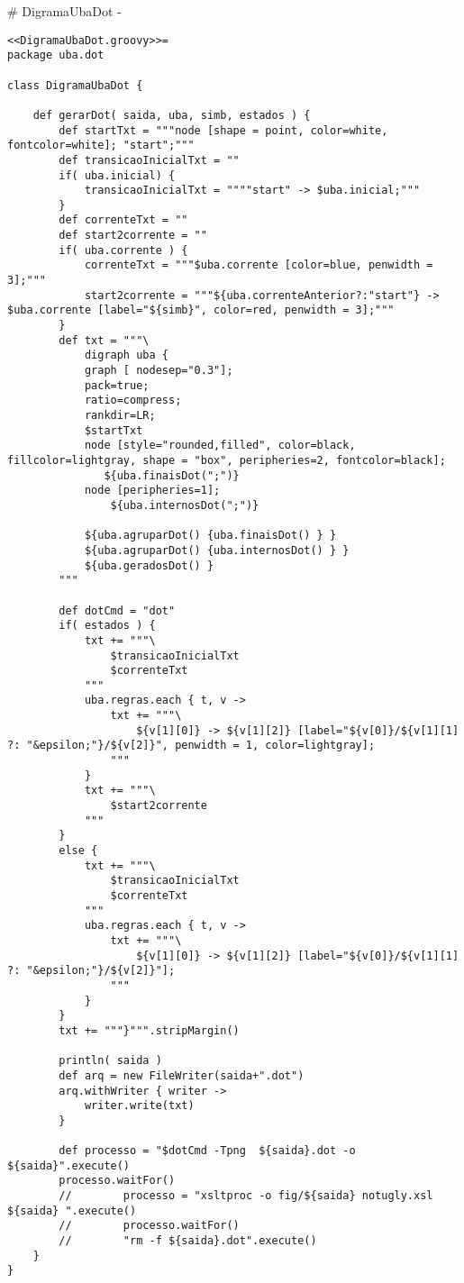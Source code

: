 # DigramaUbaDot {-}

\begin{lstlisting}[style=java]
<<DigramaUbaDot.groovy>>=
package uba.dot

class DigramaUbaDot {

    def gerarDot( saida, uba, simb, estados ) {
        def startTxt = """node [shape = point, color=white, fontcolor=white]; "start";"""
        def transicaoInicialTxt = ""
        if( uba.inicial) {
            transicaoInicialTxt = """"start" -> $uba.inicial;"""
        }
        def correnteTxt = ""
        def start2corrente = ""
        if( uba.corrente ) {
            correnteTxt = """$uba.corrente [color=blue, penwidth = 3];"""
            start2corrente = """${uba.correnteAnterior?:"start"} -> $uba.corrente [label="${simb}", color=red, penwidth = 3];"""
        }
        def txt = """\
            digraph uba {
            graph [ nodesep="0.3"];
            pack=true;
            ratio=compress;
            rankdir=LR;
            $startTxt
            node [style="rounded,filled", color=black, fillcolor=lightgray, shape = "box", peripheries=2, fontcolor=black];
               ${uba.finaisDot(";")}
            node [peripheries=1];
                ${uba.internosDot(";")}

            ${uba.agruparDot() {uba.finaisDot() } }
            ${uba.agruparDot() {uba.internosDot() } }
            ${uba.geradosDot() }
        """

        def dotCmd = "dot"
        if( estados ) {
            txt += """\
                $transicaoInicialTxt
                $correnteTxt
            """
            uba.regras.each { t, v ->
                txt += """\
                    ${v[1][0]} -> ${v[1][2]} [label="${v[0]}/${v[1][1] ?: "&epsilon;"}/${v[2]}", penwidth = 1, color=lightgray];
                """
            }
            txt += """\
                $start2corrente
            """
        }
        else {
            txt += """\
                $transicaoInicialTxt
                $correnteTxt
            """
            uba.regras.each { t, v ->
                txt += """\
                    ${v[1][0]} -> ${v[1][2]} [label="${v[0]}/${v[1][1] ?: "&epsilon;"}/${v[2]}"];
                """
            }
        }
        txt += """}""".stripMargin()

        println( saida )
        def arq = new FileWriter(saida+".dot")
        arq.withWriter { writer ->
            writer.write(txt)
        }

        def processo = "$dotCmd -Tpng  ${saida}.dot -o ${saida}".execute()
        processo.waitFor()
        //        processo = "xsltproc -o fig/${saida} notugly.xsl ${saida} ".execute()
        //        processo.waitFor()
        //        "rm -f ${saida}.dot".execute()
    }
}


\end{lstlisting}
